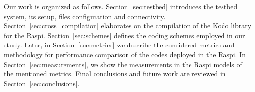 Our work is organized as follows. Section~\ref{sec:testbed} introduces the
testbed system, its setup, files configuration and connectivity.
Section~\ref{sec:cross_compilation} elaborates on the compilation of
the Kodo library for the \ac{Raspi}. Section~\ref{sec:schemes} defines the
coding schemes employed in our study. Later, in Section~\ref{sec:metrics}
we describe the considered metrics and methodology for performance comparison
of the codes deployed in the \ac{Raspi}. In Section~\ref{sec:measurements}, we
show the measurements in the \ac{Raspi} models of the mentioned metrics. Final
conclusions and future work are reviewed in Section~\ref{sec:conclusions}.

